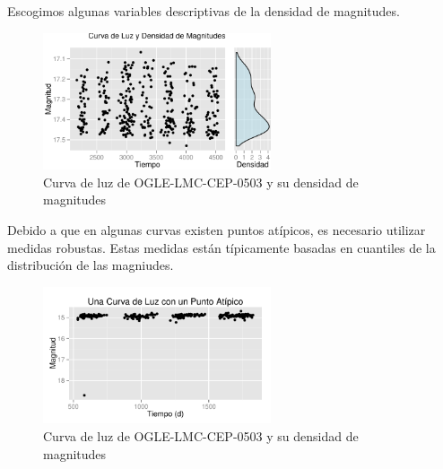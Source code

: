 \documentclass{beamer}
\begin{document}
\begin{frame}
  Escogimos algunas variables descriptivas de la densidad de magnitudes.
  \begin{figure}
    \centering
    \includegraphics[width=0.6\textwidth]{./img/curvaHist.pdf}
    \caption{ Curva de luz de OGLE-LMC-CEP-0503 y su densidad de magnitudes}
    \label{fig:gull}
  \end{figure}%
\end{frame}

\begin{frame}
  Debido a que en algunas curvas existen puntos atípicos, es necesario utilizar medidas robustas. Estas medidas están típicamente basadas en cuantiles de la distribución de las magniudes. 
  \begin{figure}
    \centering
    \includegraphics[width=0.6\textwidth]{./img/curvaRara.pdf}
    \caption{ Curva de luz de OGLE-LMC-CEP-0503 y su densidad de magnitudes}
    \label{fig:gull}
  \end{figure}%
\end{frame}
\end{document}
